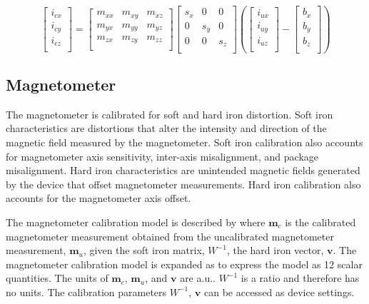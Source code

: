 \begin{equation}
    \label{eq:inertialExpanded}
    \begin{bmatrix}
        i_{cx}\\
        i_{cy}\\
        i_{cz}\\
    \end{bmatrix}
    =
    \begin{bmatrix}
        m_{xx} & m_{xy} & m_{xz}\\
        m_{yx} & m_{yy} & m_{yz}\\
        m_{zx} & m_{zy} & m_{zz}\\
    \end{bmatrix}
    \begin{bmatrix}
        s_{x} & 0 & 0\\
        0 & s_{y} & 0\\
        0 & 0 & s_{z}\\
    \end{bmatrix}
    \left(
    \begin{bmatrix}
        i_{ux}\\
        i_{uy}\\
        i_{uz}\\
    \end{bmatrix}
    -
    \begin{bmatrix}
        b_{x}\\
        b_{y}\\
        b_{z}\\
    \end{bmatrix}
    \right)
\end{equation}

\subsection{Magnetometer}
\label{sec:magnetometer}

The magnetometer is calibrated for soft and hard iron distortion.
Soft iron characteristics are distortions that alter the intensity and direction of the magnetic field measured by the magnetometer.
Soft iron calibration also accounts for magnetometer axis sensitivity, inter-axis misalignment, and package misalignment.  
Hard iron characteristics are unintended magnetic fields generated by the device that offset magnetometer measurements.  
Hard iron calibration also accounts for the magnetometer axis offset.

The magnetometer calibration model is described by  where $\pmb{m}_c$ is the calibrated magnetometer measurement obtained from the uncalibrated magnetometer measurement, $\pmb{m}_u$, given the soft iron matrix, $W^{-1}$, the hard iron vector, $\pmb{v}$.  
The magnetometer calibration model is expanded as  to express the model as 12 scalar quantities.
The units of $\pmb{m}_c$, $\pmb{m}_u$, and $\pmb{v}$ are \ac{a.u.}.  
$W^{-1}$ is a ratio and therefore has no units.  
The calibration parameters $W^{-1}$, $\pmb{v}$ can be accessed as device settings.

